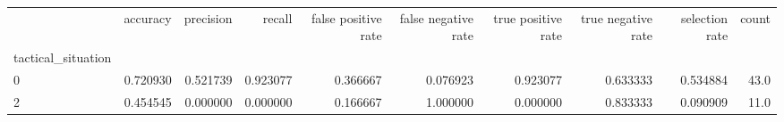\begin{tabular}{lrrrrrrrrr}
\toprule
{} &  accuracy &  precision &    recall &  false positive rate &  false negative rate &  true positive rate &  true negative rate &  selection rate &  count \\
tactical\_situation &           &            &           &                      &                      &                     &                     &                 &        \\
\midrule
0                  &  0.720930 &   0.521739 &  0.923077 &             0.366667 &             0.076923 &            0.923077 &            0.633333 &        0.534884 &   43.0 \\
2                  &  0.454545 &   0.000000 &  0.000000 &             0.166667 &             1.000000 &            0.000000 &            0.833333 &        0.090909 &   11.0 \\
\bottomrule
\end{tabular}
